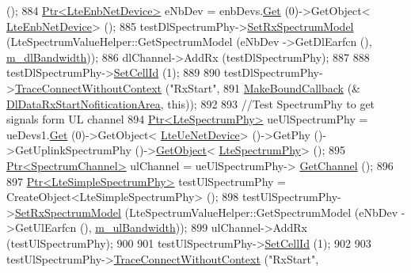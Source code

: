 \begin{DoxyCode}
       ();
884   \hyperlink{classns3_1_1Ptr}{Ptr<LteEnbNetDevice>} eNbDev = enbDevs.\hyperlink{classns3_1_1NetDeviceContainer_a677d62594b5c9d2dea155cc5045f4d0b}{Get} (0)->GetObject<
      \hyperlink{classns3_1_1LteEnbNetDevice}{LteEnbNetDevice}> ();
885   testDlSpectrumPhy->\hyperlink{classns3_1_1LteSimpleSpectrumPhy_a1cbc14b5951a6c9360d3b180760429d9}{SetRxSpectrumModel} (LteSpectrumValueHelper::GetSpectrumModel (eNbDev
      ->GetDlEarfcn (), \hyperlink{classLteFrAreaTestCase_a645fc2cea287afbd373f6d702152cf47}{m\_dlBandwidth}));
886   dlChannel->AddRx (testDlSpectrumPhy);
887 
888   testDlSpectrumPhy->\hyperlink{classns3_1_1LteSimpleSpectrumPhy_aed3e4883b1f03358a744746b08fbd5d8}{SetCellId} (1);
889 
890   testDlSpectrumPhy->\hyperlink{classns3_1_1ObjectBase_a1be45f6fd561e75dcac9dfa81b2b81e4}{TraceConnectWithoutContext} (\textcolor{stringliteral}{"RxStart"},
891                                                  \hyperlink{group__makeboundcallback_ga1725d6362e6065faa0709f7c93f8d770}{MakeBoundCallback} (&
      \hyperlink{lte-test-frequency-reuse_8cc_a39fd51e5983e3a2105d2862729ad91e0}{DlDataRxStartNofiticationArea}, \textcolor{keyword}{this}));
892 
893   \textcolor{comment}{//Test SpectrumPhy to get signals form UL channel}
894   \hyperlink{classns3_1_1Ptr}{Ptr<LteSpectrumPhy>} ueUlSpectrumPhy = ueDevs1.\hyperlink{classns3_1_1NetDeviceContainer_a677d62594b5c9d2dea155cc5045f4d0b}{Get} (0)->GetObject<
      \hyperlink{classns3_1_1LteUeNetDevice}{LteUeNetDevice}> ()->GetPhy ()->GetUplinkSpectrumPhy ()->\hyperlink{classns3_1_1Object_a13e18c00017096c8381eb651d5bd0783}{GetObject}<
      \hyperlink{classns3_1_1LteSpectrumPhy}{LteSpectrumPhy}> ();
895   \hyperlink{classns3_1_1Ptr}{Ptr<SpectrumChannel>} ulChannel = ueUlSpectrumPhy->
      \hyperlink{classns3_1_1LteSpectrumPhy_a50f13e43568687ee32c5d63e5bf639c2}{GetChannel} ();
896 
897   \hyperlink{classns3_1_1Ptr}{Ptr<LteSimpleSpectrumPhy>} testUlSpectrumPhy = CreateObject<LteSimpleSpectrumPhy>
       ();
898   testUlSpectrumPhy->\hyperlink{classns3_1_1LteSimpleSpectrumPhy_a1cbc14b5951a6c9360d3b180760429d9}{SetRxSpectrumModel} (LteSpectrumValueHelper::GetSpectrumModel (eNbDev
      ->GetUlEarfcn (), \hyperlink{classLteFrAreaTestCase_afa54487d9f12658bbead39e1272f4d8c}{m\_ulBandwidth}));
899   ulChannel->AddRx (testUlSpectrumPhy);
900 
901   testUlSpectrumPhy->\hyperlink{classns3_1_1LteSimpleSpectrumPhy_aed3e4883b1f03358a744746b08fbd5d8}{SetCellId} (1);
902 
903   testUlSpectrumPhy->\hyperlink{classns3_1_1ObjectBase_a1be45f6fd561e75dcac9dfa81b2b81e4}{TraceConnectWithoutContext} (\textcolor{stringliteral}{"RxStart"},

\end{DoxyCode}
